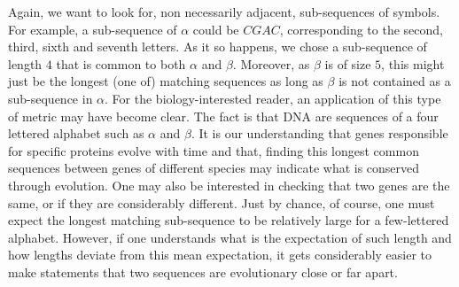 Again, we want to look for, non necessarily adjacent, sub-sequences of symbols. For example, a sub-sequence of $\alpha$ could be $CGAC$, corresponding to the second, third, sixth and seventh letters. As it so happens, we chose a sub-sequence of length $4$ that is common to both $\alpha$ and $\beta$. Moreover, as $\beta$ is of size $5$, this might just be the longest (one of) matching sequences as long as $\beta$ is not contained as a sub-sequence in $\alpha$. For the biology-interested reader, an application of this type of metric may have become clear. The fact is that DNA are sequences of a four lettered alphabet such as $\alpha$ and $\beta$. It is our understanding that genes responsible for specific proteins evolve with time and that, finding this longest common sequences between genes of different species may indicate what is conserved through evolution. One may also be interested in checking that two genes are the same, or if they are considerably different. Just by chance, of course, one must expect the longest matching sub-sequence to be relatively large for a few-lettered alphabet. However, if one understands what is the expectation of such length and how lengths deviate from this mean expectation, it gets considerably easier to make statements that two sequences are evolutionary close or far apart.

